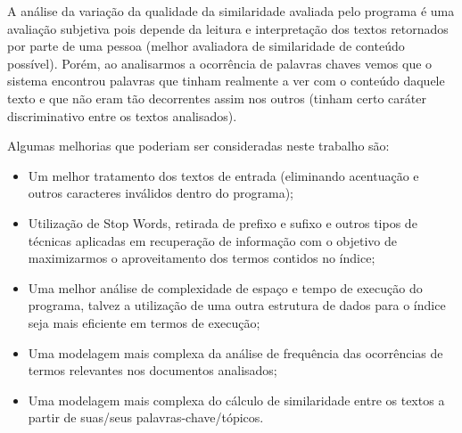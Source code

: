 \documentclass[12pt]{article}
\begin{document}
A análise da variação da qualidade da similaridade avaliada pelo programa é uma avaliação 
subjetiva pois depende da leitura e interpretação dos textos retornados por parte de uma
pessoa (melhor avaliadora de similaridade de conteúdo possível). Porém, ao analisarmos a 
ocorrência de palavras chaves vemos que o sistema encontrou palavras que tinham realmente 
a ver com o conteúdo daquele texto e que não eram tão decorrentes assim nos outros (tinham 
certo caráter discriminativo entre os textos analisados).

Algumas melhorias que poderiam ser consideradas neste trabalho são:
\begin{itemize}
\item Um melhor tratamento dos textos de entrada (eliminando acentuação e outros 
caracteres inválidos dentro do programa);
\item Utilização de Stop Words, retirada de prefixo e sufixo e outros tipos de técnicas
aplicadas em recuperação de informação com o objetivo de maximizarmos o aproveitamento dos
termos contidos no índice;
\item Uma melhor análise de complexidade de espaço e tempo de execução do programa, talvez
a utilização de uma outra estrutura de dados para o índice seja mais eficiente em termos 
de execução;
\item Uma modelagem mais complexa da análise de frequência das ocorrências de termos 
relevantes nos documentos analisados;
\item Uma modelagem mais complexa do cálculo de similaridade entre os textos a partir de 
suas/seus palavras-chave/tópicos.
\end{itemize}
\end{document}
